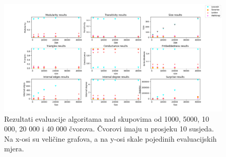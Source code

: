 \documentclass[times, utf8, diplomski]{fer}
\begin{document}
\begin{figure}[!b]
	\includegraphics[width=\linewidth]{images/test2_10.png}
	\caption{Rezultati evaluacije algoritama nad skupovima od 1000, 5000, 10 000, 20 000 i 40 000 čvorova. Čvorovi imaju u prosjeku 10 susjeda. Na x-osi su veličine grafova, a na y-osi skale pojedinih evaluacijskih mjera.}
	\label{fig:test2_10}
\end{figure}
\end{document}
